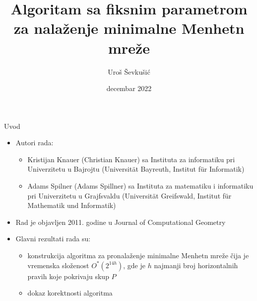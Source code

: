 \documentclass[10pt]{beamer}
\title{Algoritam sa fiksnim parametrom za nalaženje minimalne Menhetn mreže}
\author{Uroš Ševkušić}
\date{decembar 2022}
\institute{Univerzitet u Beogradu, Matematički fakultet}
\begin{document}
\begin{frame}[plain]
\begin{center}
	\titlepage
\end{center}
\end{frame}

\begin{frame}{Uvod}
\begin{itemize}
    \item Autori rada:
    \begin{itemize}
        \item Kristijan Knauer (Christian Knauer) sa Instituta za informatiku pri Univerzitetu u Bajrojtu (Universität Bayreuth, Institut für Informatik)
        \item Adams Spilner (Adams Spillner) sa Instituta za matematiku i informatiku pri Univerzitetu u Grajfsvaldu (Universität Greifswald, Institut für Mathematik und Informatik)
    \end{itemize}
    \item Rad je objavljen 2011. godine u Journal of Computational Geometry
    \item Glavni rezultati rada su:
    \begin{itemize}
        \item konstrukcija algoritma za pronalaženje minimalne Menhetn mreže čija je vremenska složenost $O^*(2^{14h})$, gde je $h$ najmanji broj horizontalnih pravih koje pokrivaju skup $P$
        \item dokaz korektnosti algoritma
    \end{itemize}
\end{itemize}
\end{frame}
\end{document}
